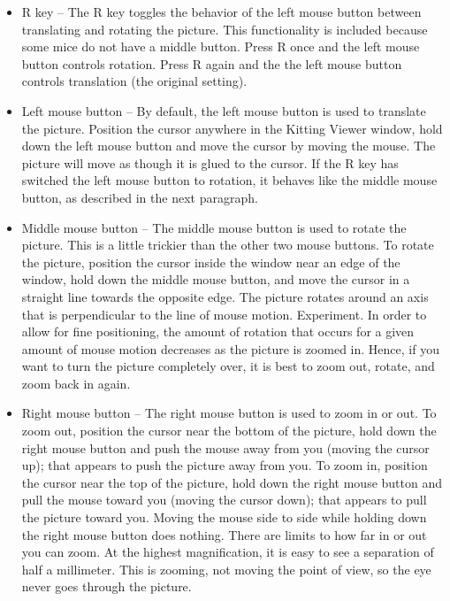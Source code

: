 \begin{itemize}

\item R key -- The R key toggles the behavior of the left mouse button
  between translating and rotating the picture. This functionality is
  included because some mice do not have a middle button. Press R once and
  the left mouse button controls rotation. Press R again and the the left
  mouse button controls translation (the original setting).\\

\item Left mouse button -- By default, the left mouse button is used to
  translate the picture. Position the cursor anywhere in the Kitting Viewer
  window, hold down the left mouse button and move the cursor by moving the
  mouse. The picture will move as though it is glued to the cursor. If the
  R key has switched the left mouse button to rotation, it behaves like the
  middle mouse button, as described in the next paragraph.\\

\item Middle mouse button -- The middle mouse button is used to rotate the
  picture. This is a little trickier than the other two mouse buttons. To
  rotate the picture, position the cursor inside the window near an edge of
  the window, hold down the middle mouse button, and move the cursor in a
  straight line towards the opposite edge. The picture rotates around an axis
  that is perpendicular to the line of mouse motion. Experiment. In order
  to allow for fine positioning, the amount of rotation that occurs for a
  given amount of mouse motion decreases as the picture is zoomed
  in. Hence, if you want to turn the picture completely over, it is best to
  zoom out, rotate, and zoom back in again.\\

\item Right mouse button -- The right mouse button is used to zoom in or
  out. To zoom out, position the cursor near the bottom of the picture,
  hold down the right mouse button and push the mouse away from you (moving
  the cursor up); that appears to push the picture away from you. To zoom
  in, position the cursor near the top of the picture, hold down the right
  mouse button and pull the mouse toward you (moving the cursor down); that
  appears to pull the picture toward you. Moving the mouse side to side
  while holding down the right mouse button does nothing. There are limits
  to how far in or out you can zoom. At the highest magnification, it is
  easy to see a separation of half a millimeter. This is zooming, not
  moving the point of view, so the eye never goes through the picture.\\


\end{itemize}

